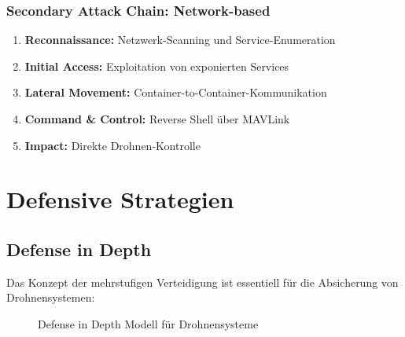 \documentclass[11pt,a4paper]{article}
\begin{document}
\subsubsection{Secondary Attack Chain: Network-based}

\begin{enumerate}[leftmargin=*]
    \item \textbf{Reconnaissance:} Netzwerk-Scanning und Service-Enumeration
    \item \textbf{Initial Access:} Exploitation von exponierten Services
    \item \textbf{Lateral Movement:} Container-to-Container-Kommunikation
    \item \textbf{Command \& Control:} Reverse Shell über MAVLink
    \item \textbf{Impact:} Direkte Drohnen-Kontrolle
\end{enumerate}

\section{Defensive Strategien}

\subsection{Defense in Depth}

Das Konzept der mehrstufigen Verteidigung ist essentiell für die Absicherung von Drohnensystemen:

\begin{figure}[h]
\centering
{}
\caption{Defense in Depth Modell für Drohnensysteme}
\end{figure}
\end{document}

